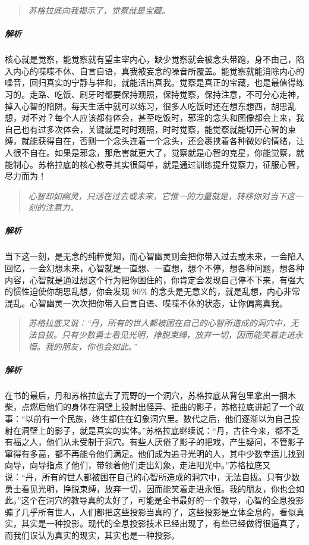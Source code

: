 \begin{quote}\it
    苏格拉底向我揭示了，觉察就是宝藏。
\end{quote}

\subparagraph{解析} 核心就是觉察，能觉察就有望主宰内心，缺少觉察就会被念头带跑，身不由己，陷入内心的喋喋不休、自言自语，真我被妄念的噪音所覆盖。能觉察就能消除内心的噪音，回归真实的宁静与祥和，就能活出真我。觉察是真正的宝藏，也是最值得练习的。走路、吃饭、刷牙时都要保持观照，保持觉察，保持注意，不可分心走神，掉入心智的陷阱。每天生活中就可以练习，很多人吃饭时还在想东想西，胡思乱想，对不对？每个人应该都有体会，甚至吃饭时，邪淫的念头和图像都会上来，我自己也有过多次体会，关键就是时时观照，时时觉察，能觉察就能切开心智的束缚，就能获得自在，否则一个念头连着一个念头，还会裹挟着各种微妙的情绪，让人很不自在。如果是邪念，那危害就更大了，觉察就是心智的克星，你能觉察，就能制心。苏格拉底的核心教导其实很简单，就是通过训练提升觉察力，征服心智，尽力而为！

\begin{quote}\it
    心智却如幽灵，只活在过去或未来，它惟一的力量就是，转移你对当下这一刻的注意力。
\end{quote}

\subparagraph{解析} 当下这一刻，是无念的纯粹觉知，而心智幽灵则会把你带入过去或未来，一会陷入回忆，一会幻想未来，心智就是一直想、一直想，想个不停，想各种问题，想各种内容，心智就是通过想这个行为把你困住的，你肯定会发现自己停不下来，有强大的惯性迫使你胡思乱想，你会发现 90\% 的念头是无意义的，就是乱想，内心非常混乱。心智幽灵一次次把你带入自言自语、喋喋不休的状态，让你偏离真我。

\begin{quote}\it
    苏格拉底又说：“丹，所有的世人都被困在自己的心智所造成的洞穴中，无法自拔。只有少数勇士看见光明，挣脱束缚，放弃一切，因而能笑着走进永恒。我的朋友，你也会如此。”
\end{quote}

\subparagraph{解析} 在书的最后，丹和苏格拉底去了荒野的一个洞穴，苏格拉底从背包里拿出一捆木柴，点燃后他们的身体在洞壁上投射出怪异、扭曲的影子，苏格拉底讲起了一个故事：“以前有一个民族，终生都住在幻象洞穴里。数代之后，他们逐渐以为自己投射在洞壁上的影子，就是真实的实体。”苏格拉底继续说：“丹，古往今来，都不乏有福之人，他们从未受制于洞穴。有些人厌倦了影子的把戏，产生疑问，不管影子窜得有多高，都不再能令他们满足。他们成为追寻光明的人，其中少数幸运儿找到向导，向导指点了他们，带领着他们走出幻象，走进阳光中。”苏格拉底又说：“丹，所有的世人都被困在自己的心智所造成的洞穴中，无法自拔。只有少数勇士看见光明，挣脱束缚，放弃一切，因而能笑着走进永恒。我的朋友，你也会如此。”这个在洞穴的教导真的太好了，可能是全书最好的一个教导，心智的全息投影骗了几乎所有世人，人们都把这些投影当真的了，这些投影是立体全息的，看似真实，其实是一种投影。现代的全息投影技术已经出现了，有些已经做得很逼真了，而我们误认为真实的现实，其实也是一种投影。

